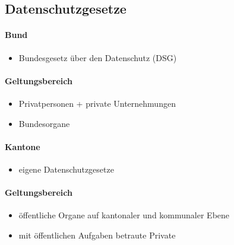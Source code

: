 \subsection{Datenschutzgesetze}
\begin{minipage}{0.5\linewidth}
    \paragraph{Bund}
    \begin{itemize}
        \item Bundesgesetz über den Datenschutz (DSG)
    \end{itemize}
    \paragraph{Geltungsbereich}
    \begin{itemize}
        \item Privatpersonen + private Unternehmungen
        \item Bundesorgane
    \end{itemize}
\end{minipage}
\begin{minipage}{0.5\linewidth}
    \paragraph{Kantone}
    \begin{itemize}
        \item eigene Datenschutzgesetze
    \end{itemize}
    \paragraph{Geltungsbereich}
    \begin{itemize}
        \item öffentliche Organe auf kantonaler und kommunaler Ebene
        \item mit öffentlichen Aufgaben betraute Private
    \end{itemize}
\end{minipage}

